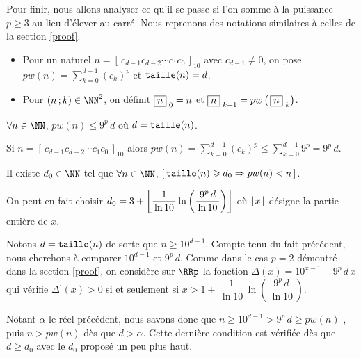 Pour finir, nous allons analyser ce qu'il se passe si l'on somme à la puissance $p \geqslant 3$ au lieu d'élever au carré.
Nous reprenons des notations similaires à celles de la section \ref{proof}.
\begin{itemize}[label = \textbullet]
	\item Pour un naturel $n =  \left[ \, c_{d-1} c_{d-2} \cdots c_1 c_0 \, \right]_{10}$ avec $c_{d-1} \neq 0$,
	on pose
	$\displaystyle pw(n) = \sum_{k=0}^{d-1} (c_k)^p$
	et
	$\operatorname{\text{\normalfont\texttt{taille}}}(n) = d$.
	
	\item Pour $(n \,; k) \in \NN^2$, on définit 
	$\fbox{$n$}_{\,\,0} = n$
	et
	$\fbox{$n$}_{\,\,k+1} = pw \left( \, \fbox{$n$}_{\,\,k} \right)$.
\end{itemize}

 

\bigskip

\begin{fact}
	$\forall n \in \NN$, $pw(n) \leqslant 9^p \, d$ où $d = \operatorname{\text{\normalfont\texttt{taille}}}(n)$.
\end{fact}

\begin{proof*}
	Si $n = \left[ \, c_{d-1} c_{d-2} \cdots c_1 c_0 \, \right]_{10}$
	alors 
	$\displaystyle pw(n) = \sum_{k=0}^{d-1} (c_k)^p \leqslant \sum_{k=0}^{d-1} 9^p = 9^p \, d $.
\end{proof*}




\medskip

\begin{fact}\label{magicmajo}
	Il existe $d_0 \in \NN$ tel que $\forall n \in \NN$,	
	$[ \, \operatorname{\text{\normalfont\texttt{taille}}}(n) \geqslant d_0 \Rightarrow pw(n) < n \, ]$.
	
	\smallskip
	On peut en fait choisir $d_0 = 3 + \left\lfloor \dfrac{1}{\, \ln 10 \,} \ln \left( \dfrac{ \, 9^p \, d \, }{\, \ln 10 \,} \right) \right\rfloor$
	où $\left\lfloor x \right\rfloor$ désigne la partie entière de $x$.
\end{fact}

\begin{proof*}
	Notons $d = \operatorname{\text{\normalfont\texttt{taille}}}(n)$ de sorte que $n \geqslant 10^{d-1}$.
	Compte tenu du fait précédent, nous cherchons à comparer $10^{d-1}$ et $9^p \, d$.
	Comme dans le cas $p = 2$ démontré dans la section \ref{proof}, on considère sur $\RRp$ la fonction $\Delta(x) = 10^{x-1} - 9^p \, d \, x$
	qui vérifie $\Delta^\prime(x) > 0$ 
	si et seulement si
	$x > 1 + \dfrac{1}{\, \ln 10 \,} \ln \left( \dfrac{ \, 9^p \, d \, }{\, \ln 10 \,} \right)$.
	
	
	\medskip
	
	Notant $\alpha$ le réel précédent, nous savons donc que $n \geqslant 10^{d-1} > 9^p \, d \geqslant pw(n)$ ,
	puis $n > pw(n)$ dès que $d > \alpha$.
	Cette dernière condition est vérifiée dès que $d \geqslant d_0$ avec le $d_0$ proposé un peu plus haut.
\end{proof*}




